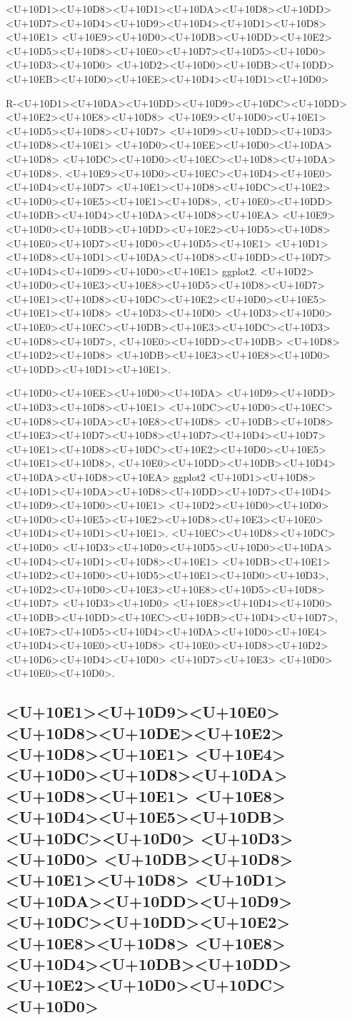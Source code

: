 \documentclass{article}
\begin{document}
<U+10D1><U+10D8><U+10D1><U+10DA><U+10D8><U+10DD><U+10D7><U+10D4><U+10D9><U+10D4><U+10D1><U+10D8><U+10E1> <U+10E9><U+10D0><U+10DB><U+10DD><U+10E2><U+10D5><U+10D8><U+10E0><U+10D7><U+10D5><U+10D0> <U+10D3><U+10D0> <U+10D2><U+10D0><U+10DB><U+10DD><U+10EB><U+10D0><U+10EE><U+10D4><U+10D1><U+10D0>

R-<U+10D1><U+10DA><U+10DD><U+10D9><U+10DC><U+10DD><U+10E2><U+10E8><U+10D8> <U+10E9><U+10D0><U+10E1><U+10D5><U+10D8><U+10D7> <U+10D9><U+10DD><U+10D3><U+10D8><U+10E1> <U+10D0><U+10EE><U+10D0><U+10DA><U+10D8> <U+10DC><U+10D0><U+10EC><U+10D8><U+10DA><U+10D8>. <U+10E9><U+10D0><U+10EC><U+10D4><U+10E0><U+10D4><U+10D7> <U+10E1><U+10D8><U+10DC><U+10E2><U+10D0><U+10E5><U+10E1><U+10D8>, <U+10E0><U+10DD><U+10DB><U+10D4><U+10DA><U+10D8><U+10EA> <U+10E9><U+10D0><U+10DB><U+10DD><U+10E2><U+10D5><U+10D8><U+10E0><U+10D7><U+10D0><U+10D5><U+10E1> <U+10D1><U+10D8><U+10D1><U+10DA><U+10D8><U+10DD><U+10D7><U+10D4><U+10D9><U+10D0><U+10E1> ggplot2. <U+10D2><U+10D0><U+10E3><U+10E8><U+10D5><U+10D8><U+10D7> <U+10E1><U+10D8><U+10DC><U+10E2><U+10D0><U+10E5><U+10E1><U+10D8> <U+10D3><U+10D0> <U+10D3><U+10D0><U+10E0><U+10EC><U+10DB><U+10E3><U+10DC><U+10D3><U+10D8><U+10D7>, <U+10E0><U+10DD><U+10DB> <U+10D8><U+10D2><U+10D8> <U+10DB><U+10E3><U+10E8><U+10D0><U+10DD><U+10D1><U+10E1>.

<U+10D0><U+10EE><U+10D0><U+10DA> <U+10D9><U+10DD><U+10D3><U+10D8><U+10E1> <U+10DC><U+10D0><U+10EC><U+10D8><U+10DA><U+10E8><U+10D8> <U+10DB><U+10D8><U+10E3><U+10D7><U+10D8><U+10D7><U+10D4><U+10D7> <U+10E1><U+10D8><U+10DC><U+10E2><U+10D0><U+10E5><U+10E1><U+10D8>, <U+10E0><U+10DD><U+10DB><U+10D4><U+10DA><U+10D8><U+10EA> ggplot2 <U+10D1><U+10D8><U+10D1><U+10DA><U+10D8><U+10DD><U+10D7><U+10D4><U+10D9><U+10D0><U+10E1> <U+10D2><U+10D0><U+10D0><U+10D0><U+10E5><U+10E2><U+10D8><U+10E3><U+10E0><U+10D4><U+10D1><U+10E1>. <U+10EC><U+10D8><U+10DC><U+10D0> <U+10D3><U+10D0><U+10D5><U+10D0><U+10DA><U+10D4><U+10D1><U+10D8><U+10E1> <U+10DB><U+10E1><U+10D2><U+10D0><U+10D5><U+10E1><U+10D0><U+10D3>, <U+10D2><U+10D0><U+10E3><U+10E8><U+10D5><U+10D8><U+10D7> <U+10D3><U+10D0> <U+10E8><U+10D4><U+10D0><U+10DB><U+10DD><U+10EC><U+10DB><U+10D4><U+10D7>, <U+10E7><U+10D5><U+10D4><U+10DA><U+10D0><U+10E4><U+10D4><U+10E0><U+10D8> <U+10E0><U+10D8><U+10D2><U+10D6><U+10D4><U+10D0> <U+10D7><U+10E3> <U+10D0><U+10E0><U+10D0>.

\subsection*{ <U+10E1><U+10D9><U+10E0><U+10D8><U+10DE><U+10E2><U+10D8><U+10E1> <U+10E4><U+10D0><U+10D8><U+10DA><U+10D8><U+10E1> <U+10E8><U+10D4><U+10E5><U+10DB><U+10DC><U+10D0> <U+10D3><U+10D0> <U+10DB><U+10D8><U+10E1><U+10D8> <U+10D1><U+10DA><U+10DD><U+10D9><U+10DC><U+10DD><U+10E2><U+10E8><U+10D8> <U+10E8><U+10D4><U+10DB><U+10DD><U+10E2><U+10D0><U+10DC><U+10D0>}
\end{document}
